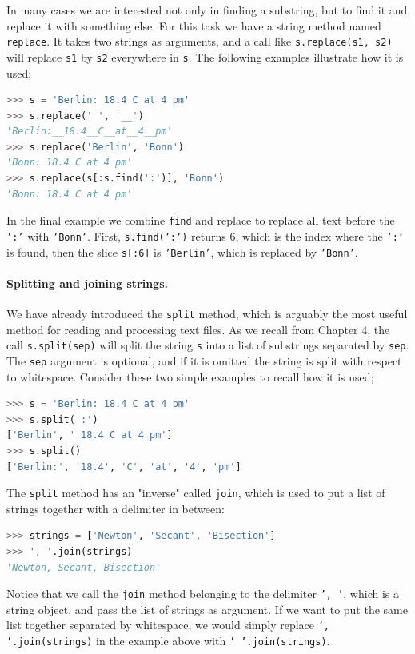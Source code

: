 \documentclass[graybox,envcountchap,sectrefs,final]{svmonodo}
\begin{document}
In many cases we are interested not only in finding a substring, but to find it and replace it with something else.
For this task we have a string method named \texttt{replace}. It takes two strings as arguments, and a call
like \texttt{s.replace(s1, s2)} will replace \texttt{s1} by \texttt{s2} everywhere in \texttt{s}. The following examples illustrate how
it is used;
\begin{lstlisting}[language=Python,style=blue1]
>>> s = 'Berlin: 18.4 C at 4 pm'
>>> s.replace(' ', '__')
'Berlin:__18.4__C__at__4__pm'
>>> s.replace('Berlin', 'Bonn')
'Bonn: 18.4 C at 4 pm'
>>> s.replace(s[:s.find(':')], 'Bonn')
'Bonn: 18.4 C at 4 pm'
\end{lstlisting}
In the final example we combine \texttt{find} and replace to replace all text before the \texttt{':'} with \texttt{'Bonn'}. First,
\texttt{s.find(':')} returns 6, which is the index where the \texttt{':'} is found, then the slice
\texttt{s[:6]} is \texttt{'Berlin'}, which is replaced by \texttt{'Bonn'}.

\paragraph{Splitting and joining strings.}
We have already introduced the \texttt{split} method, which is arguably the most useful method for reading
and processing text files. As we recall from Chapter 4, the call \texttt{s.split(sep)} will split the string \texttt{s}
into a list of substrings separated by \texttt{sep}. The \texttt{sep} argument is optional, and if it is omitted the string
is split with respect to whitespace. Consider these two simple examples to recall how it is used;
\begin{lstlisting}[language=Python,style=blue1]
>>> s = 'Berlin: 18.4 C at 4 pm'
>>> s.split(':')
['Berlin', ' 18.4 C at 4 pm']
>>> s.split()
['Berlin:', '18.4', 'C', 'at', '4', 'pm']
\end{lstlisting}
The \texttt{split} method has an "inverse" called \texttt{join}, which is used to put a list of strings together with a
delimiter in between:
\begin{lstlisting}[language=Python,style=blue1]
>>> strings = ['Newton', 'Secant', 'Bisection']
>>> ', '.join(strings)
'Newton, Secant, Bisection'
\end{lstlisting}
Notice that we call the \texttt{join} method belonging to the delimiter \texttt{', '}, which is a string object, and pass the list of
strings as argument. If we want to put the same list together separated by whitespace, we would simply
replace \texttt{', '.join(strings)} in the example above with \texttt{' '.join(strings)}.
\end{document}
